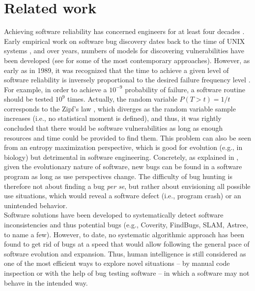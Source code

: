 \section{Related work}
\label{sec:related}
Achieving software reliability has concerned engineers for at least four decades \cite{littlewood1973bayesian,adams1984textordfeminineoptimizing,littlewood1989predicting}. Early empirical work on software bug discovery dates back to the time of UNIX systems \cite{miller1990empirical}, and over years, numbers of models for discovering vulnerabilities have been developed (see \cite{yamaguchi2014modeling,zhao2016empirical} for some of the most contemporary approaches). However, as early as in 1989, it was recognized that the time to achieve a given level of software reliability is inversely proportional to the desired failure frequency level \cite{adams1984textordfeminineoptimizing}. For example, in order to achieve a $10^{-9}$ probability of failure, a software routine should be tested  $10^{9}$ times. Actually, the random variable $P(T > t) = 1/t$ corresponds to the Zipf's law \cite{maillart2008empirical,saichev2009theory}, which diverges as the random variable sample increases (i.e., no statistical moment is defined), and thus, it was rightly concluded that there would be software vulnerabilities as long as enough resources and time could be provided to find them. This problem can also be seen from an entropy maximization perspective, which is good for evolution (e.g., in biology) but detrimental in software engineering. Concretely, as explained in \cite{brady1999murphy}, given the evolutionary nature of software, new bugs can be found in a software program as long as use perspectives change. The difficulty of bug hunting is therefore not about finding a bug {\it per se}, but rather about envisioning all possible use situations, which would reveal a software defect (i.e., program crash) or an unintended behavior.\\

Software solutions have been developed to systematically detect software inconsistencies and thus potential bugs (e.g., Coverity, FindBugs, SLAM, Astree, to name a few). However, to date, no systematic algorithmic approach has been found to get rid of bugs at a speed that would allow following the general pace of software evolution and expansion. Thus, human intelligence is still considered as one of the most efficient ways to explore novel situations -- by manual code inspection or with the help of bug testing software -- in which a software may not behave in the intended way.\\

